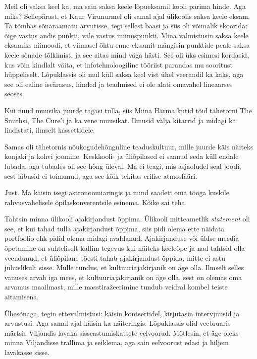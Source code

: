 Meil oli saksa keel ka, ma sain saksa keele lõpueksamil kooli parima hinde. 
Aga miks? Sellepärast, et Kaur Virunurmel oli samal 
ajal ülikoolis saksa keele eksam. Ta tõmbas sõnaraamatu arvutisse, tegi sellest baasi ja siis oli 
võimalik skoorida: õige vastus andis punkti, vale vastus miinuspunkti. Mina 
valmistusin saksa keele eksamiks niimoodi, et viimasel õhtu enne eksamit mängisin punktide peale saksa keele sõnade tõlkimist, ja 
see aitas mind väga hästi. See oli üks esimesi kordasid, kus 
võin kindlalt väita, et infotehnoloogiline tööriist parandas mu sooritust 
hüppeliselt. Lõpuklassis oli mul küll saksa keel vist ühel veerandil ka kaks, aga 
see oli ealine iseärasus, hinded ja teadmised ei ole alati 
omavahel lineaarses seoses.

Kui nüüd muusika juurde tagasi tulla, siis Miina Härma  kutid tõid tähetorni
The Smithsi, The Cure'i ja 
ka vene muusikat. Ilmusid välja kitarrid ja 
midagi ka lindistati, ilmselt kassettidele. 

Samas oli tähetornis nõukogudehõnguline teaduskultuur, mille juurde 
käis näiteks konjaki ja kohvi joomine. Keskkooli- ja 
üliõpilased ei saanud seda küll endale lubada, aga tubades oli see hõng üleval. Ma ei 
teagi, mis asjaoludel seal joodi, sest läbusid 
ei toimunud, aga see kõik tekitas erilise atmosfääri.


Just. Ma käisin isegi astronoomiaringis ja mind saadeti 
oma tööga kuskile rahvusvahelisele
õpilaskonverentsile esinema. Kõike sai teha.


Tahtsin minna ülikooli ajakirjandust õppima. Ülikooli mitteametlik \emph{statement} oli see, 
et kui tahad tulla ajakirjandust õppima, siis pidi olema ette näidata portfoolio ehk
pidid olema midagi avaldanud. Ajakirjanduse või üldse meedia õpetamine on 
suhteliselt kallim tegevus kui näiteks keeleõpe ja nad tahtsid olla veendunud, et üliõpilane tõesti tahab ajakirjandust õppida, mitte ei astu 
juhuslikult sisse. Mulle tundus, et kultuuriajakirjanik on äge olla. Ilmselt selles vanuses 
arvab iga mees, et kultuuriajakirjanik on äge olla, sest on olemas oma arvamus maailmast, mille masstiražeerimine tundub 
veidral kombel teiste aitamisena.

Ühesõnaga, tegin ettevalmistusi: käisin 
kontsertidel, kirjutasin intervjuusid ja arvustusi. 
Aga samal ajal käisin ka näiteringis. Lõpuklassis olid veebruaris-märtsis 
Viljandis lavaka sisseastumiskatsete 
eelvoorud. Mõtlesin, et äge oleks minna Viljandisse trallima ja 
seiklema, aga sain eelvoorust edasi ja hiljem lavakasse sisse.

